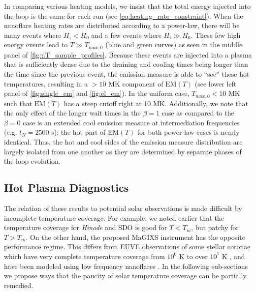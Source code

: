 \documentclass[preprint,linenumbers]{aastex}
\begin{document}
	\par In comparing various heating models, we insist that the total energy injected into the loop is the same for each run (see \autoref{eq:heating_rate_constraint}). When the nanoflare heating rates are distributed according to a power-law, there will be many events where $H_i<H_0$ and a few events where $H_i\gg H_0$. These few high energy events lead to $T\gg T_{max,0}$ (blue and green curves) as seen in the middle panel of \autoref{fig:nT_sample_profiles}. Because these events are injected into a plasma that is sufficiently dense due to the draining and cooling times being longer than the time since the previous event, the emission measure is able to ``see'' these hot temperatures, resulting in a $>10$ MK component of $\mathrm{EM}(T)$ (see lower left panel of \autoref{fig:single_em} and \autoref{fig:el_em}). In the uniform case, $T_{max,0}<10$ MK such that $\mathrm{EM}(T)$ has a steep cutoff right at 10 MK. Additionally, we note that the only effect of the longer wait times in the $\beta=1$ case as compared to the $\beta=0$ case is an extended cool emission measure at intermediation frequencies (e.g. $t_N=2500$ s); the hot part of $\mathrm{EM}(T)$ for both power-law cases is nearly identical. Thus, the hot and cool sides of the emission measure distribution are largely isolated from one another as they are determined by separate phases of the loop evolution.
	\subsection{Hot Plasma Diagnostics}
	\label{subsec:diagnostics}
	The relation of these results to potential solar observations is made difficult by incomplete temperature coverage. For example, we noted earlier that the temperature coverage for \textit{Hinode} and SDO is good for $T<T_m$, but patchy for $T>T_m$. On the other hand, the proposed MaGIXS instrument has the opposite performance regime. This differs from EUVE observations of some stellar coronae which have very complete temperature coverage from $10^6$ K to over $10^7$ K \citep[e.g.][]{sanz-forcada_structure_2003}, and have been modeled using low frequency nanoflares \citep{cargill_temperature-emission_2006}. In the following sub-sections we propose ways that the paucity of solar temperature coverage can be partially remedied.
\end{document}

